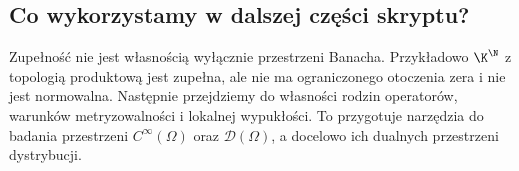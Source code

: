 \subsection{Co wykorzystamy w dalszej części skryptu?}

Zupełność nie jest własnością wyłącznie przestrzeni Banacha.
Przykładowo $\K^{\N}$ z topologią produktową jest zupełna,
ale nie ma ograniczonego otoczenia zera i nie jest normowalna.
Następnie przejdziemy do własności rodzin operatorów, warunków
metryzowalności i lokalnej wypukłości. To przygotuje narzędzia
do badania przestrzeni $C^\infty(\Omega)$ oraz $\mathcal D(\Omega)$,
a docelowo ich dualnych przestrzeni dystrybucji.
